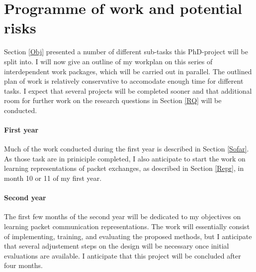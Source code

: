 \documentclass[a4paper,12pt,twoside]{report}
\begin{document}

\chapter{Programme of work and potential risks}

Section \ref{Obj} presented a number of different sub-tasks this PhD-project will be split into. I will now give an outline of my workplan on this series of interdependent work packages, which will be carried out in parallel. The outlined plan of work is relatively conservative to accomodate enough time for different tasks. I expect that several projects will be completed sooner and that additional room for further work on the research questions in Section \ref{RQ} will be conducted.

\subsubsection{First year}

Much of the work conducted during the first year is described in Section \ref{Sofar}. As those task are in priniciple completed, I also anticipate to start the work on learning representations of packet exchanges, as described in Section \ref{Repr}, in month 10 or 11 of my first year.

\subsubsection{Second year}

The first few months of the second year will be dedicated to my objectives on learning packet communication representations. The work will essentially consist of
implementing, training, and evaluating the proposed methods, but I anticipate that several adjustement steps on the design will be necessary once initial evaluations are available. I anticipate that this project will be concluded after four months.
\end{document}
